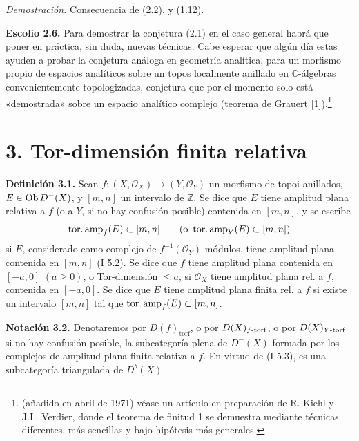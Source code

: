 \emph{Demostración.} Consecuencia de (2.2),  y (1.12).

\textbf{Escolio 2.6.} Para demostrar la conjetura (2.1) en el caso general habrá que poner en práctica, sin duda, nuevas técnicas. Cabe esperar que algún día estas ayuden a probar la conjetura análoga en geometría analítica, para un morfismo propio de espacios analíticos sobre un topos localmente anillado en \(\mathbb C\)-álgebras convenientemente topologizadas, conjetura que por el momento solo está «demostrada» sobre un espacio analítico complejo (teorema de Grauert [1]).\footnote{(añadido en abril de 1971) véase un artículo en preparación de R. Kiehl y J.L. Verdier, donde el teorema de finitud 1 se demuestra mediante técnicas diferentes, más sencillas y bajo hipótesis más generales.}

\section*{3. Tor-dimensión finita relativa}

\textbf{Definición 3.1.} Sean \(f:(X,\mathcal O_X)\longrightarrow(Y,\mathcal O_Y)\) un morfismo de topoi anillados, \(E\in\operatorname{Ob} D^{-}(X)\), y \([m,n]\) un intervalo de \(\mathbb Z\). Se dice que \(E\) tiene amplitud plana relativa a \(f\) (o a \(Y\), si no hay confusión posible) contenida en \([m,n]\), y se escribe
\[
  \operatorname{tor.amp}_f(E)\subset[m,n]\qquad(\text{o }\operatorname{tor.amp}_Y(E)\subset[m,n])
\]
si \(E\), considerado como complejo de \(f^{-1}(\mathcal O_Y)\)-módulos, tiene amplitud plana contenida en \([m,n]\) (I 5.2). Se dice que \(f\) tiene amplitud plana contenida en \([-a,0]\) \((a\geq0)\), o Tor-dimensión \(\leq a\), si \(\mathcal O_X\) tiene amplitud plana rel. a \(f\), contenida en \([-a,0]\). Se dice que \(E\) tiene amplitud plana finita rel. a \(f\) si existe un intervalo \([m,n]\) tal que \(\operatorname{tor.amp}_f(E)\subset[m,n]\).

\textbf{Notación 3.2.} Denotaremos por \(D(f)_{\mathrm{torf}}\), o por \(D(X)_{f\text{-}\mathrm{torf}}\), o por \(D(X)_{Y\text{-}\mathrm{torf}}\) si no hay confusión posible, la subcategoría plena de \(D^{-}(X)\) formada por los complejos de amplitud plana finita relativa a \(f\). En virtud de (I 5.3), es una subcategoría triangulada de \(D^b(X)\).

